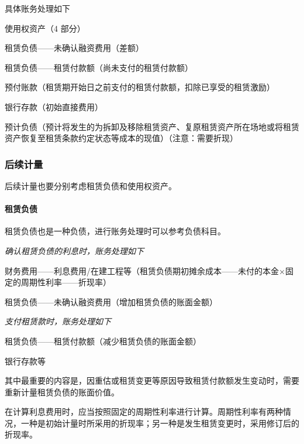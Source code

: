 \documentclass[UTF8,12pt]{ctexart}
\newenvironment{Dr}{%
	\begin{list}{}%
		{
			\setlength{\leftmargin}{2em}
			\setlength{\labelwidth}{2em}
			\setlength{\labelsep}{0pt}
			\setlength{\itemindent}{0pt}
			\setlength{\listparindent}{0pt}
			\setlength{\parsep}{0pt}
			\setlength{\topsep}{0pt}
		}
		\item[\textbf{借：}]
	}{%
	\end{list}
}
\newenvironment{Cr}{%
	\begin{list}{}%
		{
			\setlength{\leftmargin}{3em}
			\setlength{\labelwidth}{2em}
			\setlength{\labelsep}{0pt}
			\setlength{\itemindent}{0pt}
			\setlength{\listparindent}{0pt}
			\setlength{\parsep}{0pt}
			\setlength{\topsep}{0pt}
		}
		\item[\textbf{贷：}]
	}{%
	\end{list}
}
\numberwithin{equation}{section} %
\numberwithin{figure}{section}
\numberwithin{table}{section}
\begin{document}
	具体账务处理如下
	
	\begin{Dr}
		使用权资产（4 部分）
		
		租赁负债——未确认融资费用（差额）
	\end{Dr}
	\begin{Cr}
		租赁负债——租赁付款额（尚未支付的租赁付款额）
		
		预付账款（租赁期开始日之前支付的租赁付款额，扣除已享受的租赁激励） 
		
		银行存款（初始直接费用）
		
		预计负债（预计将发生的为拆卸及移除租赁资产、复原租赁资产所在场地或将租赁资产恢复至租赁条款约定状态等成本的现值）（注意：需要折现）
	\end{Cr}
	
	
	
	\subsubsection{后续计量}
	后续计量也要分别考虑租赁负债和使用权资产。
	
	\paragraph{租赁负债}
	租赁负债也是一种负债，进行账务处理时可以参考负债科目。
	
	\textit{确认租赁负债的利息时，账务处理如下}
	
	\begin{Dr}
		财务费用——利息费用/在建工程等（租赁负债期初摊余成本——未付的本金×固定的周期性利率——折现率）
	\end{Dr}
	\begin{Cr}
		租赁负债——未确认融资费用（增加租赁负债的账面金额）
	\end{Cr}

	\textit{支付租赁款时，账务处理如下}
	
	\begin{Dr}
		租赁负债——租赁付款额（减少租赁负债的账面金额）
	\end{Dr}
	\begin{Cr}
		银行存款等
	\end{Cr}

	其中最重要的内容是，因重估或租赁变更等原因导致租赁付款额发生变动时，需要重新计量租赁负债的账面价值。
	
	在计算利息费用时，应当按照固定的周期性利率进行计算。周期性利率有两种情况，一种是初始计量时所采用的折现率；另一种是发生租赁变更时，采用修订后的折现率。
	
\end{document}
